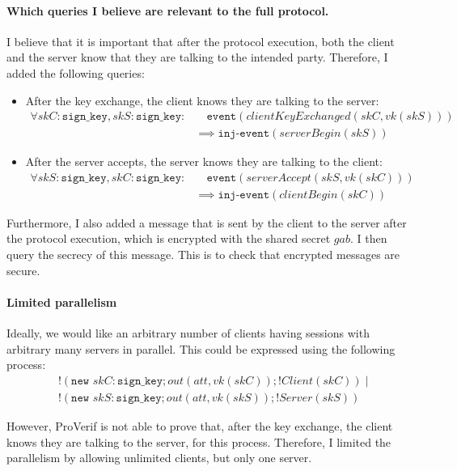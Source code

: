 \documentclass[12pt,a4paper]{article}
\begin{document}
\paragraph{Which queries I believe are relevant to the full protocol.}

I believe that it is important that after the protocol execution, both the client and the server know 
that they are talking to the intended party. Therefore, I added the following queries:
\begin{itemize}
    \item After the key exchange, the client knows they are talking to the server:
    \begin{align*}
        \forall skC: \texttt{sign\_key}, skS: \texttt{sign\_key}: &\quad \texttt{event}(clientKeyExchanged(skC, vk(skS))) \\
        &\implies \texttt{inj-event}(serverBegin(skS))
    \end{align*}
    \item After the server accepts, the server knows they are talking to the client:
    \begin{align*}
        \forall skS: \texttt{sign\_key}, skC: \texttt{sign\_key}: &\quad \texttt{event}(serverAccept(skS, vk(skC))) \\
        &\implies \texttt{inj-event}(clientBegin(skC))
    \end{align*}
\end{itemize}

Furthermore, I also added a message that is sent by the client to the server after the protocol 
execution, which is encrypted with the shared secret $gab$. I then query the secrecy of this 
message. This is to check that encrypted messages are secure.

\paragraph{Limited parallelism}

Ideally, we would like an arbitrary number of clients having sessions with arbitrary many servers 
in parallel. This could be expressed using the following process:
\begin{align*}
    &!(\texttt{new }skC: \texttt{sign\_key}; out(att, vk(skC)); !Client(skC)) \mid \\
    &!(\texttt{new }skS: \texttt{sign\_key}; out(att, vk(skS)); !Server(skS))
\end{align*}

However, ProVerif is not able to prove that, after the key exchange, the client knows they are talking 
to the server, for this process. Therefore, I limited the parallelism by allowing unlimited clients, but
only one server.
\end{document}
